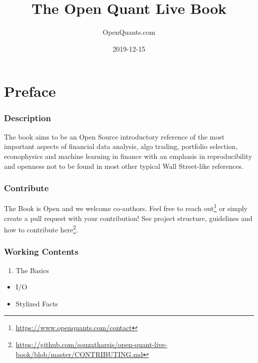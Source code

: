 \documentclass[]{book}
\title{The Open Quant Live Book}
\author{OpenQuants.com}
\date{2019-12-15}
\DeclareRobustCommand{\href}[2]{#2\footnote{\url{#1}}}
\providecommand{\tightlist}{%
  \setlength{\itemsep}{0pt}\setlength{\parskip}{0pt}}
\theoremstyle{definition}
\theoremstyle{definition}
\theoremstyle{definition}
\theoremstyle{remark}
\begin{document}


\maketitle

{
\hypersetup{linkcolor=}
\setcounter{tocdepth}{2}
\tableofcontents
}
\newcommand{\independent}{\perp\!\!\!\!\perp}

\DeclarePairedDelimiter\ceil{\lceil}{\rceil}
\DeclarePairedDelimiter\floor{\lfloor}{\rfloor}

\chapter*{Preface}\label{preface}


\subsection*{Description}\label{description}


The book aims to be an Open Source introductory reference of the most
important aspects of financial data analysis, algo trading, portfolio
selection, econophysics and machine learning in finance with an emphasis
in reproducibility and openness not to be found in most other typical
Wall Street-like references.

\subsection*{Contribute}\label{contribute}


The Book is Open and we welcome co-authors. Feel free to
\href{https://www.openquants.com/contact}{reach out} or simply create a
pull request with your contribution! See project structure, guidelines
and how to contribute
\href{https://github.com/souzatharsis/open-quant-live-book/blob/master/CONTRIBUTING.md}{here}.

\subsection*{Working Contents}\label{working-contents}


\begin{enumerate}
\def\labelenumi{\arabic{enumi}.}
\tightlist
\item
  The Basics
\end{enumerate}

\begin{itemize}
\tightlist
\item
  I/O
\item
  Stylized Facts
\end{itemize}
\end{document}
